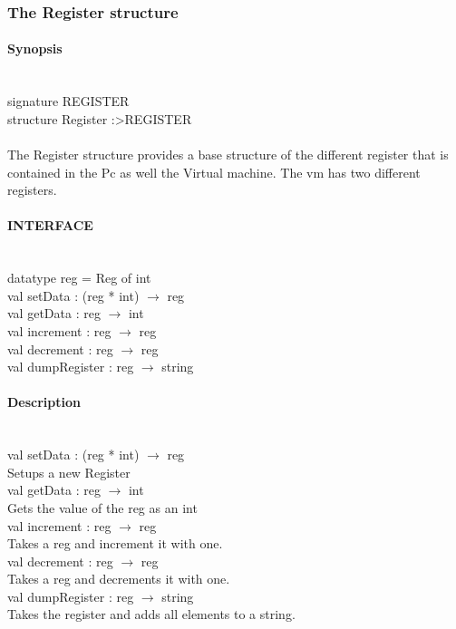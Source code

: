 \documentclass{article}
\begin{document}
\subsubsection{The Register structure}
\paragraph{Synopsis} \
\\
signature REGISTER\\
structure Register :\textgreater REGISTER\\
\\
The Register structure provides a base structure of the different register that
is contained in the Pc as well the Virtual machine. The vm has two different registers.\\
\paragraph{INTERFACE} \
\\
	datatype reg = Reg of int 
\\	
	val setData : (reg * int) $\rightarrow$ reg 				
\\	val getData : reg $\rightarrow$ int						
\\	val increment : reg $\rightarrow$ reg						
\\	val decrement : reg $\rightarrow$ reg						
\\	val dumpRegister : reg $\rightarrow$ string
\paragraph{Description} \ 
\\

	val setData : (reg * int) $\rightarrow$ reg\\
		Setups a new Register \\
	val getData : reg $\rightarrow$ int	\\
		Gets the value of the reg as an int\\					
	val increment : reg $\rightarrow$ reg\\		
		Takes a reg and increment it with one.\\	
	val decrement : reg $\rightarrow$ reg\\					
		Takes a reg and decrements it with one.\\
	val dumpRegister : reg $\rightarrow$ string\\
		Takes the register and adds all elements to a string.\\
\end{document}
